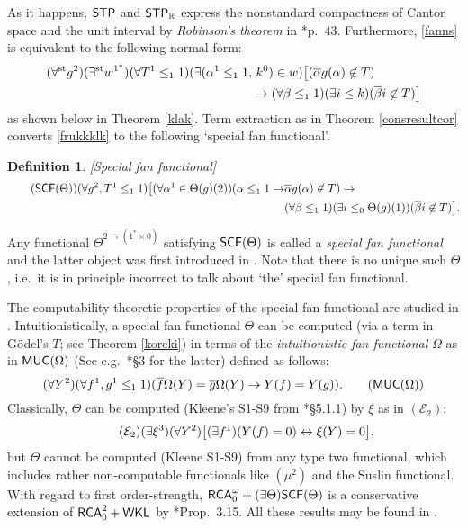 \documentclass[reqno]{amsart}
\newtheorem{defi}[thm]{Definition}
\newcommand\be{\begin{equation}}
\newcommand\ee{\end{equation}}
\def\bdefi{\begin{defi}\rm}
\def\edefi{\end{defi}}
\def\STP{\textup{\textsf{STP}}}
\def\RCA{\textup{\textsf{RCA}}}
\def\RCAo{\textup{\textsf{RCA}}_{0}^{\omega}}
\def\WKL{\textup{\textsf{WKL}}}
\def\R{{\mathbb  R}}
\def\MUC{\textup{\textsf{MUC}}}
\def\R{{\mathbb{R}}}
\def\st{\textup{st}}
\def\asa{\leftrightarrow}
\def\di{\rightarrow}
\def\SCF{\textup{\textsf{SCF}}}
\numberwithin{equation}{section}
\numberwithin{thm}{section}
\begin{document}
\medskip

As it happens, $\STP$ and $\STP_{\R}$ express the nonstandard compactness of Cantor space and the unit interval by \emph{Robinson's theorem} in \cite{loeb1}*{p.\ 43}.  
Furthermore, \eqref{fanns} is equivalent to the following normal form:
\begin{align}\label{frukkklk}
(\forall^{\st}g^{2})(\exists^{\st}w^{1^{*}})(\forall T^{1}\leq_{1}1)(\exists ( \alpha^{1}\leq_{1}1,  &~k^{0}) \in w)\big[(\overline{\alpha}g(\alpha)\not\in T)\\
&\di(\forall \beta\leq_{1}1)(\exists i\leq k)(\overline{\beta}i\not\in T) \big] \notag
\end{align}
as shown below in Theorem \ref{klak}.  Term extraction as in Theorem \ref{consresultcor} converts \eqref{frukkklk} to the following `special fan functional'.
\bdefi[Special fan functional]
\begin{align}\label{fanns333}\tag{$\SCF(\Theta)$}
(\forall g^{2}, T^{1}\leq_{1}1)\big[ (\forall  \alpha^{1}\in \Theta(g)(2))(\alpha\leq_{1}1\di& \overline{\alpha}g(\alpha)\not\in T)\di\\
 &(\forall \beta\leq_{1}1)(\exists i\leq_{0}\Theta(g)(1))(\overline{\beta}i\not\in T) \big].\notag
\end{align}
\edefi
Any functional $\Theta^{2\di (1^{*}\times 0)}$ satisfying $\SCF(\Theta)$ is called a \emph{special fan functional} and the latter object was first introduced in \cite{samGH}.  
Note that there is no unique such $\Theta$, i.e.\ it is in principle incorrect to talk about `the' special fan functional.  %

\medskip

The computability-theoretic properties of the special fan functional are studied in \cites{samGH, dagsam}. Intuitionistically, a special fan functional $\Theta$ can be computed (via a term in G\"odel's ${T}$; see Theorem \ref{koreki}) in terms of the \emph{intuitionistic fan functional} $\Omega$ as in $\MUC(\Omega)$ (See e.g.\ \cite{kohlenbach2}*{\S3} for the latter) defined as follows:
\be
(\forall Y^{2}) (\forall f^{1}, g^{1}\leq_{1}1)(\overline{f}\Omega(Y)=\overline{g}\Omega(Y)\notag \di Y(f)=Y(g)). \label{lukl3}\tag{$\textsf{\textup{MUC}}(\Omega)$}
\ee
Classically, $\Theta$ can be computed (Kleene's S1-S9 from \cite{longmann}*{\S5.1.1}) by $\xi$ as in $(\mathcal{E}_{2})$: %
\be\tag{$\mathcal{E}_{2}$}\label{hah}
(\exists \xi^{3})(\forall Y^{2})\big[  (\exists f^{1})(Y(f)=0)\asa \xi(Y)=0  \big].
\ee
but $\Theta$ cannot be computed (Kleene S1-S9) from any type two functional, which includes rather non-computable functionals like $(\mu^{2})$ and the Suslin functional.  
With regard to first order-strength, $\RCAo+(\exists \Theta)\SCF(\Theta)$ is a conservative extension of $\RCA_{0}^{2}+\WKL$ by \cite{kohlenbach2}*{Prop.\ 3.15}.  
All these results may be found in \cite{dagsam}.
\end{document}
